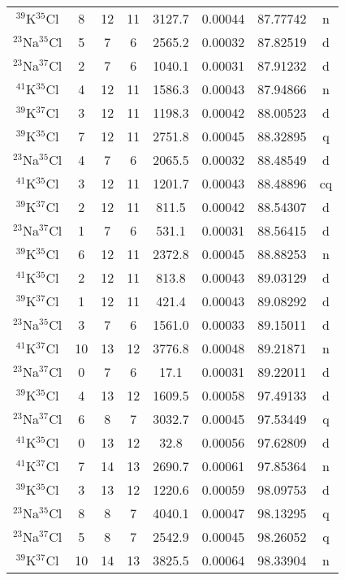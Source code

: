 \begin{table*}[htp]
\begin{tabular}{cccccccc}
$^{39}$K$^{35}$Cl & 8 & 12 & 11 & 3127.7 & 0.00044 & 87.77742 & n \\
$^{23}$Na$^{35}$Cl & 5 & 7 & 6 & 2565.2 & 0.00032 & 87.82519 & d \\
$^{23}$Na$^{37}$Cl & 2 & 7 & 6 & 1040.1 & 0.00031 & 87.91232 & d \\
$^{41}$K$^{35}$Cl & 4 & 12 & 11 & 1586.3 & 0.00043 & 87.94866 & n \\
$^{39}$K$^{37}$Cl & 3 & 12 & 11 & 1198.3 & 0.00042 & 88.00523 & d \\
$^{39}$K$^{35}$Cl & 7 & 12 & 11 & 2751.8 & 0.00045 & 88.32895 & q \\
$^{23}$Na$^{35}$Cl & 4 & 7 & 6 & 2065.5 & 0.00032 & 88.48549 & d \\
$^{41}$K$^{35}$Cl & 3 & 12 & 11 & 1201.7 & 0.00043 & 88.48896 & cq \\
$^{39}$K$^{37}$Cl & 2 & 12 & 11 & 811.5 & 0.00042 & 88.54307 & d \\
$^{23}$Na$^{37}$Cl & 1 & 7 & 6 & 531.1 & 0.00031 & 88.56415 & d \\
$^{39}$K$^{35}$Cl & 6 & 12 & 11 & 2372.8 & 0.00045 & 88.88253 & n \\
$^{41}$K$^{35}$Cl & 2 & 12 & 11 & 813.8 & 0.00043 & 89.03129 & d \\
$^{39}$K$^{37}$Cl & 1 & 12 & 11 & 421.4 & 0.00043 & 89.08292 & d \\
$^{23}$Na$^{35}$Cl & 3 & 7 & 6 & 1561.0 & 0.00033 & 89.15011 & d \\
$^{41}$K$^{37}$Cl & 10 & 13 & 12 & 3776.8 & 0.00048 & 89.21871 & n \\
$^{23}$Na$^{37}$Cl & 0 & 7 & 6 & 17.1 & 0.00031 & 89.22011 & d \\
$^{39}$K$^{35}$Cl & 4 & 13 & 12 & 1609.5 & 0.00058 & 97.49133 & d \\
$^{23}$Na$^{37}$Cl & 6 & 8 & 7 & 3032.7 & 0.00045 & 97.53449 & q \\
$^{41}$K$^{35}$Cl & 0 & 13 & 12 & 32.8 & 0.00056 & 97.62809 & d \\
$^{41}$K$^{37}$Cl & 7 & 14 & 13 & 2690.7 & 0.00061 & 97.85364 & n \\
$^{39}$K$^{35}$Cl & 3 & 13 & 12 & 1220.6 & 0.00059 & 98.09753 & d \\
$^{23}$Na$^{35}$Cl & 8 & 8 & 7 & 4040.1 & 0.00047 & 98.13295 & q \\
$^{23}$Na$^{37}$Cl & 5 & 8 & 7 & 2542.9 & 0.00045 & 98.26052 & q \\
$^{39}$K$^{37}$Cl & 10 & 14 & 13 & 3825.5 & 0.00064 & 98.33904 & n \\

\end{tabular}
\end{table*}
